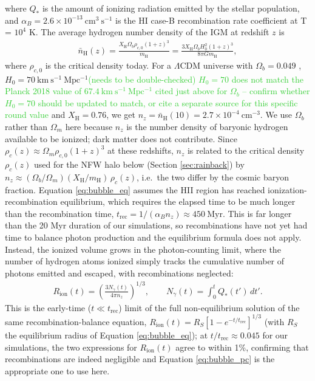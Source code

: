 \documentclass[twocolumn,linenumbers]{aastex631}
\begin{document}
where $Q_*$ is the amount of ionizing radiation emitted by the stellar population, and $\alpha_B = 2.6\times10^{-13}\ \mathrm{cm^3\ s^{-1}}$ is the HI case-B recombination rate coefficient at T = $10^4$ K. The average hydrogen number density of the IGM at redshift $z$ is
\begin{align}
    \bar{n}_\mathrm{H}(z) = \frac{X_\mathrm{H} \Omega_b \rho_{c,0} (1+z)^3}{m_\mathrm{H}} = \frac{3 X_\mathrm{H} \Omega_b H_0^2 (1+z)^3}{8\pi G m_\mathrm{H}},
\end{align}
where $\rho_{c,0}$ is the critical density today. For a $\Lambda$CDM universe with $\Omega_b = 0.049$ \citep{2020A&A...641A...6P}, $H_0 = 70\ \mathrm{km\ s^{-1}\ Mpc^{-1}}$\textcolor{limegreen}{(needs to be double-checked) $H_0=70$ does not match the Planck 2018 value of $67.4\ \mathrm{km\ s^{-1}\ Mpc^{-1}}$ cited just above for $\Omega_b$ -- confirm whether $H_0=70$ should be updated to match, or cite a separate source for this specific round value} and $X_\mathrm{H} = 0.76$, we get $n_z = \bar{n}_\mathrm{H}(10) = 2.7\times 10^{-4}\ \mathrm{cm^{-3}}$. We use $\Omega_b$ rather than $\Omega_m$ here because $n_z$ is the number density of baryonic hydrogen available to be ionized; dark matter does not contribute. Since $\rho_c(z) \approx \Omega_m \rho_{c,0}(1+z)^3$ at these redshifts, $n_z$ is related to the critical density $\rho_c(z)$ used for the NFW halo below (Section \ref{sec:rainback}) by $n_z \approx (\Omega_b/\Omega_m)(X_\mathrm{H}/m_\mathrm{H})\,\rho_c(z)$, i.e.\ the two differ by the cosmic baryon fraction.
Equation \ref{eq:bubble_eq} assumes the HII region has reached ionization-recombination equilibrium, which requires the elapsed time to be much longer than the recombination time, $t_\mathrm{rec} = 1/(\alpha_B n_z) \approx 450\ \mathrm{Myr}$. This is far longer than the 20 Myr duration of our simulations, so recombinations have not yet had time to balance photon production and the equilibrium formula does not apply. Instead, the ionized volume grows in the photon-counting limit, where the number of hydrogen atoms ionized simply tracks the cumulative number of photons emitted and escaped, with recombinations neglected:
\begin{align}
    R_\mathrm{ion}(t) = \left(\frac{3 N_\gamma(t)}{4\pi n_z}\right)^{1/3}, \qquad N_\gamma(t) = \int_0^t Q_*(t')\,dt'. \label{eq:bubble_pc}
\end{align}
This is the early-time ($t \ll t_\mathrm{rec}$) limit of the full non-equilibrium solution of the same recombination-balance equation, $R_\mathrm{ion}(t) = R_S\left[1-e^{-t/t_\mathrm{rec}}\right]^{1/3}$ \citep{2011piim.book.....D} (with $R_S$ the equilibrium radius of Equation \ref{eq:bubble_eq}); at $t/t_\mathrm{rec}\approx0.045$ for our simulations, the two expressions for $R_\mathrm{ion}(t)$ agree to within 1\%, confirming that recombinations are indeed negligible and Equation \ref{eq:bubble_pc} is the appropriate one to use here.
\end{document}
